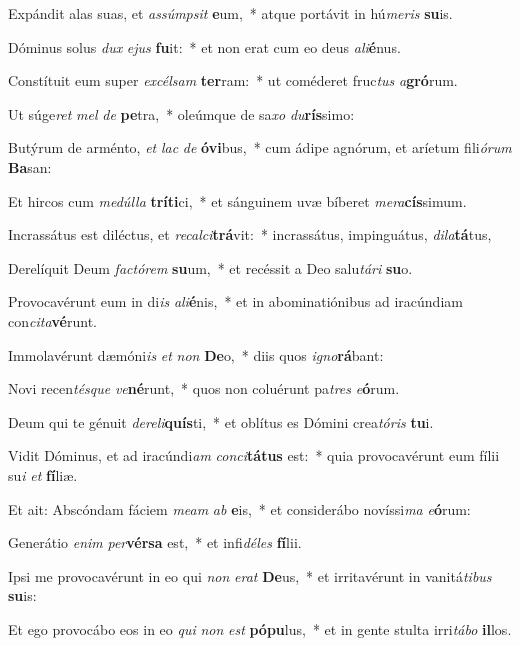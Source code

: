 \item Expándit alas suas, et \textit{as}\textit{súmp}\textit{sit} \textbf{e}um,~* atque portávit in hú\textit{me}\textit{ris} \textbf{su}is.
\item Dóminus solus \textit{dux} \textit{e}\textit{jus} \textbf{fu}it:~* et non erat cum eo deus \textit{a}\textit{li}\textbf{é}nus.
\item Constítuit eum super \textit{ex}\textit{cél}\textit{sam} \textbf{ter}ram:~* ut coméderet fruc\textit{tus} \textit{a}\textbf{gró}rum.
\item Ut súge\textit{ret} \textit{mel} \textit{de} \textbf{pe}tra,~* oleúmque de sa\textit{xo} \textit{du}\textbf{rís}simo:
\item Butýrum de arménto, \textit{et} \textit{lac} \textit{de} \textbf{ó}\textbf{vi}bus,~* cum ádipe agnórum, et aríetum fili\textit{ó}\textit{rum} \textbf{Ba}san:
\item Et hircos cum \textit{me}\textit{dúl}\textit{la} \textbf{trí}\textbf{ti}ci,~* et sánguinem uvæ bíberet \textit{me}\textit{ra}\textbf{cís}simum.
\item Incrassátus est diléctus, et \textit{re}\textit{cal}\textit{ci}\textbf{trá}vit:~* incrassátus, impinguátus, \textit{di}\textit{la}\textbf{tá}tus,
\item Derelíquit Deum \textit{fac}\textit{tó}\textit{rem} \textbf{su}um,~* et recéssit a Deo salu\textit{tá}\textit{ri} \textbf{su}o.
\item Provocavérunt eum in di\textit{is} \textit{a}\textit{li}\textbf{é}nis,~* et in abominatiónibus ad iracúndiam con\textit{ci}\textit{ta}\textbf{vé}runt.
\item Immolavérunt dæmóni\textit{is} \textit{et} \textit{non} \textbf{De}o,~* diis quos \textit{i}\textit{gno}\textbf{rá}bant:
\item Novi recen\textit{tés}\textit{que} \textit{ve}\textbf{né}runt,~* quos non coluérunt pa\textit{tres} \textit{e}\textbf{ó}rum.
\item Deum qui te génuit \textit{de}\textit{re}\textit{li}\textbf{quís}ti,~* et oblítus es Dómini crea\textit{tó}\textit{ris} \textbf{tu}i.
\item Vidit Dóminus, et ad iracúndi\textit{am} \textit{con}\textit{ci}\textbf{tá}\textbf{tus} est:~* quia provocavérunt eum fílii su\textit{i} \textit{et} \textbf{fí}liæ.
\item Et ait: Abscóndam fáciem \textit{me}\textit{am} \textit{ab} \textbf{e}is,~* et considerábo novíssi\textit{ma} \textit{e}\textbf{ó}rum:
\item Generátio \textit{e}\textit{nim} \textit{per}\textbf{vér}\textbf{sa} est,~* et infi\textit{dé}\textit{les} \textbf{fí}lii.
\item Ipsi me provocavérunt in eo qui \textit{non} \textit{e}\textit{rat} \textbf{De}us,~* et irritavérunt in vanitá\textit{ti}\textit{bus} \textbf{su}is:
\item Et ego provocábo eos in eo \textit{qui} \textit{non} \textit{est} \textbf{pó}\textbf{pu}lus,~* et in gente stulta irri\textit{tá}\textit{bo} \textbf{il}los.

